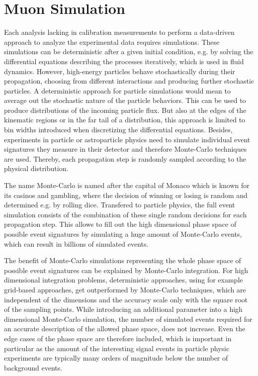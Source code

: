 \chapter{Muon Simulation} \label{sec:simulation}

Each analysis lacking in calibration measurements to perform a data-driven approach to analyze the experimental data requires simulations.
These simulations can be deterministic after a given initial condition, e.g. by solving the differential equations describing the processes iteratively, which is used in fluid dynamics.
However, high-energy particles behave stochastically during their propagation, choosing from different interactions and producing further stochastic particles.
A deterministic approach for particle simulations would mean to average out the stochastic nature of the particle behaviors.
This can be used to produce distributions of the incoming particle flux.
But also at the edges of the kinematic regions or in the far tail of a distribution, this approach is limited to bin widths introduced when discretizing the differential equations.
Besides, experiments in particle or astroparticle physics need to simulate individual event signatures they measure in their detector and therefore Monte-Carlo techniques are used.
Thereby, each propagation step is randomly sampled according to the physical distribution.

The name Monte-Carlo is named after the capital of Monaco which is known for its casinos and gambling, where the decision of winning or losing is random and determined e.g. by rolling dice.
Transfered to particle physics, the full event simulation consists of the combination of these single random decisions for each propagation step.
This allows to fill out the high dimensional phase space of possible event signatures by simulating a huge amount of Monte-Carlo events, which can result in billions of simulated events.

The benefit of Monte-Carlo simulations representing the whole phase space of possible event signatures can be explained by Monte-Carlo integration.
For high dimensional integration problems, deterministic approaches, using for example grid-based approaches, get outperformed by Monte-Carlo techniques, which are independent of the dimensions and the accuracy scale only with the square root of the sampling points.
While introducing an additional parameter into a high dimensional Monte-Carlo simulation, the number of simulated events required for an accurate description of the allowed phase space, does not increase.
Even the edge cases of the phase space are therefore included, which is important in particular as the amount of the interesting signal events in particle physic experiments are typically many orders of magnitude below the number of background events.

